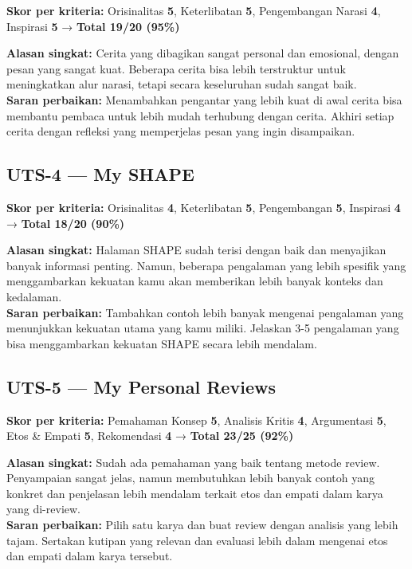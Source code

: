 \documentclass[
  letterpaper,
  DIV=11,
  numbers=noendperiod]{scrreprt}
\begin{document}
\textbf{Skor per kriteria:} Orisinalitas \textbf{5}, Keterlibatan
\textbf{5}, Pengembangan Narasi \textbf{4}, Inspirasi \textbf{5} →
\textbf{Total 19/20 (95\%)}

\textbf{Alasan singkat:} Cerita yang dibagikan sangat personal dan
emosional, dengan pesan yang sangat kuat. Beberapa cerita bisa lebih
terstruktur untuk meningkatkan alur narasi, tetapi secara keseluruhan
sudah sangat baik.\\
\textbf{Saran perbaikan:} Menambahkan pengantar yang lebih kuat di awal
cerita bisa membantu pembaca untuk lebih mudah terhubung dengan cerita.
Akhiri setiap cerita dengan refleksi yang memperjelas pesan yang ingin
disampaikan.

\subsection{UTS-4 --- My SHAPE}\label{uts-4-my-shape}

\textbf{Skor per kriteria:} Orisinalitas \textbf{4}, Keterlibatan
\textbf{5}, Pengembangan \textbf{5}, Inspirasi \textbf{4} →
\textbf{Total 18/20 (90\%)}

\textbf{Alasan singkat:} Halaman SHAPE sudah terisi dengan baik dan
menyajikan banyak informasi penting. Namun, beberapa pengalaman yang
lebih spesifik yang menggambarkan kekuatan kamu akan memberikan lebih
banyak konteks dan kedalaman.\\
\textbf{Saran perbaikan:} Tambahkan contoh lebih banyak mengenai
pengalaman yang menunjukkan kekuatan utama yang kamu miliki. Jelaskan
3-5 pengalaman yang bisa menggambarkan kekuatan SHAPE secara lebih
mendalam.

\subsection{UTS-5 --- My Personal
Reviews}\label{uts-5-my-personal-reviews-1}

\textbf{Skor per kriteria:} Pemahaman Konsep \textbf{5}, Analisis Kritis
\textbf{4}, Argumentasi \textbf{5}, Etos \& Empati \textbf{5},
Rekomendasi \textbf{4} → \textbf{Total 23/25 (92\%)}

\textbf{Alasan singkat:} Sudah ada pemahaman yang baik tentang metode
review. Penyampaian sangat jelas, namun membutuhkan lebih banyak contoh
yang konkret dan penjelasan lebih mendalam terkait etos dan empati dalam
karya yang di-review.\\
\textbf{Saran perbaikan:} Pilih satu karya dan buat review dengan
analisis yang lebih tajam. Sertakan kutipan yang relevan dan evaluasi
lebih dalam mengenai etos dan empati dalam karya tersebut.
\end{document}

